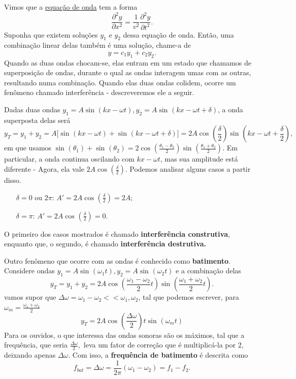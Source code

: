 \documentclass{article}
\begin{document}
  Vimos que a \hyperlink{wave_eqn}{equação de onda} tem a forma 
    \[
      \frac{\partial^{2}y}{\partial x^{2}} = \frac{1}{v^{2}}\frac{\partial^{2}y}{\partial t^{2}}.
    \]
Suponha que existem soluções \(y_{1}\) e \(y_{2}\) dessa equação de onda. Então, uma combinação linear delas também é uma solução, chame-a de 
  \[
    y = c_{1}y_{1} + c_{2}y_{2}.
  \]
Quando as duas ondas chocam-se, elas entram em um estado que chamamos de superposição de ondas, durante o qual as ondas interagem umas com as outras,
resultando numa combinação. Quando elas duas ondas colidem, ocorre um fenômeno chamado interferência - descreveremos ele a seguir.

  Dadas duas ondas \(y_{1} = A\sin^{}{(kx - \omega t)}, y_{2} = A\sin^{}{(kx - \omega t + \delta )}\), a onda superposta delas será 
  \[
    y_{T} = y_{1} + y_{2} = A \biggl[\sin^{}{(kx-\omega t)} + \sin^{}{(kx-\omega t+\delta )}\biggr] = 2A\cos^{}{(\frac{\delta }{2})}\sin^{}{(kx-\omega t+\frac{\delta }{2})},
  \]
em que usamos \(\sin^{}{(\theta_{1})}+\sin^{}{(\theta_{2})} = 2\cos^{}{(\frac{\theta_{1}-\theta_{2}}{2})}\sin^{}{(\frac{\theta_{1}+\theta_{2}}{2})}\). Em particular, a onda continua
oscilando com \(kx-\omega t\), mas sua amplitude está diferente - Agora, ela vale \(2A\cos^{}{(\frac{\delta }{2})}\). Podemos analisar alguns casos a partir disso.
\begin{itemize}
  \item[\(\delta = 0\text{ ou } 2\pi \):] \(A' = 2A\cos^{}{(\frac{\delta }{2})} = 2A;\)
  \item[\(\delta = \pi \):] \(A' = 2A\cos^{}{(\frac{\delta }{2})} = 0.\)
\end{itemize}
  O primeiro dos casos mostrados é chamado \textbf{interferência construtiva}, enquanto que, o segundo, é chamado \textbf{interferência destrutiva.}

  Outro fenômeno que ocorre com as ondas é conhecido como \textbf{batimento}. Considere ondas \(y_{1} = A\sin^{}{(\omega_{1}t)}, y_{2} = A\sin^{}{(\omega_{2}t)}\) e a combinação
delas 
  \[
    y_{T} = y_{1}+y_{2} = 2A\cos^{}{(\frac{\omega_{1}-\omega_{2}}{2}t)}\sin^{}{(\frac{\omega_{1}+\omega_{2}}{2}t)}.
  \]
vamos supor que \(\Delta \omega = \omega_{1} - \omega_{2} <<\omega_{1}, \omega_{2}\), tal que podemos escrever, para 
 \(\omega _{m} = \frac{\omega_{1}+\omega_{2}}{2}\)
  \[
    y_{T} = 2A\cos^{}{(\frac{\Delta \omega }{2})t}\sin^{}{(\omega_{m}t)}
  \]
  Para os ouvidos, o que interessa das ondas sonoras são os máximos, tal que a frequência, que seria \(\frac{\Delta \omega }{2},\) leva um fator de correção
que é multiplicá-la por 2, deixando apenas \(\Delta \omega .\) Com isso, a \textbf{frequência de batimento} é descrita como 
  \[
    f_{bat} = \Delta \omega = \frac{1}{2\pi }(\omega_{1}-\omega _{2}) = f_{1}-f_{2}.
  \]
\newpage
\end{document}
